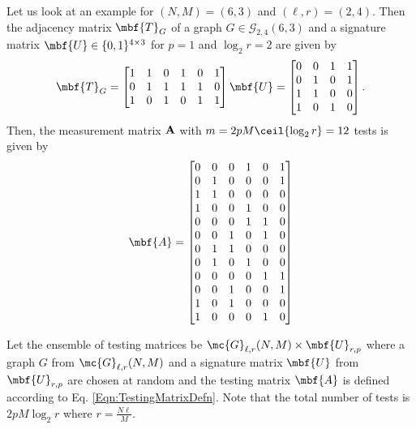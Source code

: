 \documentclass[conference,twocolumn]{IEEEtran}
\begin{document}
\begin{Example}\label{exmp:tensor}
Let us look at an example for $(N,M)=(6,3)$ and $(\ell,r)=(2,4)$. Then the adjacency matrix $\mbf{T}_G$ of a graph $G\in\mathcal{G}_{2,4}(6,3)$ and a signature matrix $\mbf{U}\in \{0,1\}^{4\times 3}$ for $p=1$ and $\log_2 r = 2$ are given by
 \[
 \mbf{T}_G = \begin{bmatrix}
1 & 1 & 0 & 1 & 0 & 1    \\
0 & 1 & 1 & 1& 1 & 0 \\
1 & 0 & 1 & 0 & 1 & 1
\end{bmatrix}
\mbf{U} = \begin{bmatrix}
0 & 0 & 1  & 1\\
0 & 1 & 0  & 1\\
1 & 1 & 0  & 0\\
1 & 0 & 1  & 0
\end{bmatrix}.
 \] 
Then, the measurement matrix $\bf A	$ with $m = 2pM\ceil{\log_2 r}=12$ tests is given by
\[ \mbf{A} = \begin{bmatrix}
0 & 0 & 0 & 1 & 0 & 1\\
0 & 1 & 0 & 0 & 0 & 1\\
1 & 1 & 0 & 0 & 0 & 0\\
1 & 0 & 0 & 1 & 0 & 0\\
0 & 0 & 0 & 1& 1 & 0 \\
0 & 0 & 1 & 0& 1 & 0 \\
0 & 1 & 1 & 0& 0 & 0 \\
0 & 1 & 0 & 1& 0 & 0 \\
0 & 0 & 0 & 0 & 1 & 1\\
0 & 0 & 1 & 0 & 0 & 1\\
1 & 0 & 1 & 0 & 0 & 0\\
1 & 0 & 0 & 0 & 1 & 0\\
\end{bmatrix}
 \]
 \end{Example}


\begin{definition}
\label{Def:RegSaffron}
Let the ensemble of testing matrices be $\mc{G}_{\ell,r}(N,M)\times \mbf{U}_{r,p}$ where a graph $G$ from $\mc{G}_{\ell,r}(N,M)$ and a signature matrix $\mbf{U}$ from $\mbf{U}_{r,p}$ are chosen at random and the testing matrix $\mbf{A}$ is defined according to Eq. \eqref{Eqn:TestingMatrixDefn}. Note that the total number of tests is $2pM\log_2 r$ where $r=\frac{N\ell}{M}$.
\end{definition}
\end{document}
